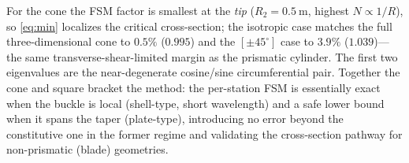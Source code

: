 For the cone the FSM factor is smallest at the \emph{tip} ($R_2=\SI{0.5}{\metre}$, highest $N\!\propto\!1/R$),
so \eqref{eq:min} localizes the critical cross-section; the isotropic case matches the full three-dimensional
cone to $0.5\%$ ($0.995$) and the $[\pm45^\circ]$ case to $3.9\%$ ($1.039$)---the same transverse-shear-limited
margin as the prismatic cylinder. The first two eigenvalues are the near-degenerate cosine/sine circumferential
pair. Together the cone and square bracket the method: the per-station FSM is essentially exact when the buckle
is local (shell-type, short wavelength) and a safe lower bound when it spans the taper (plate-type), introducing
no error beyond the constitutive one in the former regime and validating the cross-section pathway for
non-prismatic (blade) geometries.
